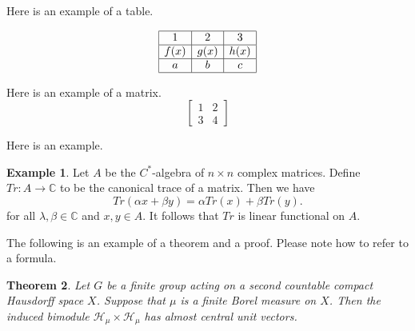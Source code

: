 \documentclass[12pt, reqno]{amsart}
\newtheorem{theorem}{Theorem}[section]
\theoremstyle{definition}
\newtheorem{example}[theorem]{Example}
\theoremstyle{remark}
\numberwithin{equation}{section}
\begin{document}

Here is an example of a table.

\begin{table}[ht]
\caption{}\label{eqtable}
\renewcommand\arraystretch{1.5}
\noindent\[
\begin{array}{|c|c|c|}
\hline
1&2&3\\
\hline f(x)&g(x)&h(x)\\
\hline a&b&c\\
\hline
\end{array}
\]
\end{table}

Here is an example of a matrix.
\begin{equation*}
\begin{bmatrix}
1 & 2 \\
3 &  4
\end{bmatrix}
\end{equation*}


Here is an example.


\begin{example} Let $A$ be the $C^*$-algebra of $n\times n$ complex matrices. Define $Tr: A\rightarrow \mathbb{C}$ to be the canonical trace of a matrix. Then we have
\begin{equation}\label{2.1}
Tr(\alpha x+\beta y)=\alpha Tr(x)+\beta Tr(y).
\end{equation}
for all $\lambda ,\beta \in  \mathbb{C}$ and $x,y\in A$. It follows that $Tr$ is linear functional on $A$.
\end{example}


The following is an example of a theorem and a proof. Please note how to refer to a formula.


\begin{theorem}\label{theo1}
Let $G$ be a finite group acting on a second countable compact Hausdorff space $X$. Suppose that $\mu$ is a finite Borel measure on $X$. Then the induced bimodule $\mathcal{H}_\mu\times \mathcal{H}_\mu$ has almost central unit vectors.
\end{theorem}
\end{document}
